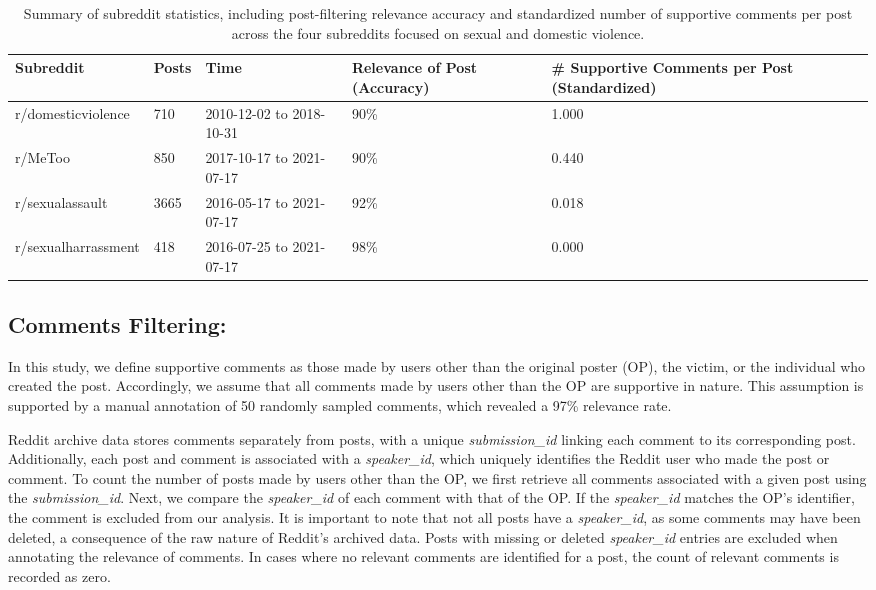 \documentclass[11pt]{article}
\begin{document}
\begin{table*}[ht!]
\centering
\renewcommand{\arraystretch}{1.5} %
{\small 
\begin{tabular}{l p{1cm} p{3.8cm} p{2.2cm} p{4cm}}
\toprule 
\textbf{Subreddit} & \textbf{Posts} & \textbf{Time} & \textbf{Relevance of Post (Accuracy)} & \textbf{\# Supportive Comments per Post (Standardized)} \\
\midrule
r/domesticviolence & 710 & 2010-12-02 to 2018-10-31 & 90\% & 1.000 \\
r/MeToo & 850 & 2017-10-17 to 2021-07-17 & 90\% & 0.440 \\
r/sexualassault & 3665 & 2016-05-17 to 2021-07-17 & 92\% & 0.018 \\
r/sexualharrassment & 418 & 2016-07-25 to 2021-07-17 & 98\% & 0.000 \\
\bottomrule
\end{tabular}
}
\caption{Summary of subreddit statistics, including post-filtering relevance accuracy and standardized number of supportive comments per post across the four subreddits focused on sexual and domestic violence.}
\label{tab:data_stats}
\end{table*}

\subsection{Comments Filtering:}
In this study, we define supportive comments as those made by users other than the original poster (OP), the victim, or the individual who created the post. Accordingly, we assume that all comments made by users other than the OP are supportive in nature. This assumption is supported by a manual annotation of 50 randomly sampled comments, which revealed a 97\% relevance rate.

Reddit archive data stores comments separately from posts, with a unique \textit{submission\_id} linking each comment to its corresponding post. Additionally, each post and comment is associated with a \textit{speaker\_id}, which uniquely identifies the Reddit user who made the post or comment.
To count the number of posts made by users other than the OP, we first retrieve all comments associated with a given post using the \textit{submission\_id}. Next, we compare the \textit{speaker\_id} of each comment with that of the OP. If the \textit{speaker\_id} matches the OP's identifier, the comment is excluded from our analysis. It is important to note that not all posts have a \textit{speaker\_id}, as some comments may have been deleted, a consequence of the raw nature of Reddit’s archived data. Posts with missing or deleted \textit{speaker\_id} entries are excluded when annotating the relevance of comments. In cases where no relevant comments are identified for a post, the count of relevant comments is recorded as zero.
\end{document}
